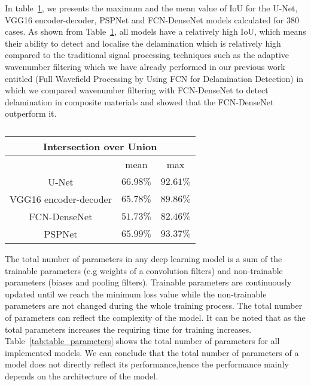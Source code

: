 In table~\ref{tab:table_iou}, we presents the maximum and the mean value of IoU for the U-Net, VGG16 encoder-decoder, PSPNet and FCN-DenseNet models calculated for 380 cases.
As shown from Table~\ref{tab:table_iou}, all models have a relatively high IoU, which means their ability to detect and localise the delamination which is relatively high compared to the traditional signal processing techniques such as the adaptive wavenumber filtering which we have already performed in our previous work entitled (Full Wavefield Processing by Using FCN for Delamination Detection) in which we compared wavenumber filtering with FCN-DenseNet to detect delamination in composite materials and showed that the FCN-DenseNet outperform it.
\begin{table}[]
	\centering
	\caption{}
	\label{tab:table_iou}
	\begin{tabular}{ccc}
		\multicolumn{3}{c}{Intersection over Union} \\ \hline
		& mean & max \\ \hline
		U-Net & \(66.98\%\) & \(92.61\%\) \\ \hline
		VGG16 encoder-decoder & \(65.78\%\) & \(89.86\%\) \\ \hline
		FCN-DenseNet & \(51.73\%\) & \(82.46\%\) \\ \hline
		PSPNet & \(65.99\%\) & \(93.37\%\) \\ \hline
	\end{tabular}
\end{table}
The total number of parameters in any deep learning model is a sum of the trainable parameters (e.g weights of a convolution filters) and non-trainable parameters (biases and  pooling filters).
Trainable parameters are continuously updated until we reach the minimum loss value while the non-trainable parameters are not changed during the whole training process.
The total number of parameters can reflect the complexity of the model.
It can be noted that as the total parameters increases the requiring time for training increases.
Table~\ref{tab:table_parameters} shows the total number of parameters for all implemented models.
We can conclude that the total number of parameters of a model does not directly reflect its performance,hence the performance mainly depends on the architecture of the model. 
